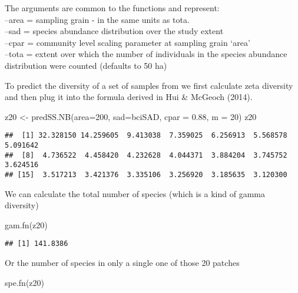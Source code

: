\documentclass[
]{article}
\newenvironment{Shaded}{\begin{snugshade}}{\end{snugshade}}
\newcommand{\AttributeTok}[1]{\textcolor[rgb]{0.77,0.63,0.00}{#1}}
\newcommand{\DecValTok}[1]{\textcolor[rgb]{0.00,0.00,0.81}{#1}}
\newcommand{\FloatTok}[1]{\textcolor[rgb]{0.00,0.00,0.81}{#1}}
\newcommand{\FunctionTok}[1]{\textcolor[rgb]{0.00,0.00,0.00}{#1}}
\newcommand{\NormalTok}[1]{#1}
\newcommand{\OtherTok}[1]{\textcolor[rgb]{0.56,0.35,0.01}{#1}}
\begin{document}
The arguments are common to the functions and represent:\\
--area = sampling grain - in the same units as tota.\\
--sad = species abundance distribution over the study extent\\
--cpar = community level scaling parameter at sampling grain `area'\\
--tota = extent over which the number of individuals in the species
abundance distribution were counted (defaults to 50 ha)

To predict the diversity of a set of samples from we first calculate
zeta diversity and then plug it into the formula derived in Hui \&
McGeoch (2014).

\begin{Shaded}
\begin{Highlighting}[]
\NormalTok{z20 }\OtherTok{\textless{}{-}} \FunctionTok{predSS.NB}\NormalTok{(}\AttributeTok{area=}\DecValTok{200}\NormalTok{, }\AttributeTok{sad=}\NormalTok{bciSAD, }\AttributeTok{cpar =} \FloatTok{0.88}\NormalTok{, }\AttributeTok{m =} \DecValTok{20}\NormalTok{)}
\NormalTok{z20}
\end{Highlighting}
\end{Shaded}

\begin{verbatim}
##  [1] 32.328150 14.259605  9.413038  7.359025  6.256913  5.568578  5.091642
##  [8]  4.736522  4.458420  4.232628  4.044371  3.884204  3.745752  3.624516
## [15]  3.517213  3.421376  3.335106  3.256920  3.185635  3.120300
\end{verbatim}

We can calculate the total number of species (which is a kind of gamma
diversity)

\begin{Shaded}
\begin{Highlighting}[]
\FunctionTok{gam.fn}\NormalTok{(z20)}
\end{Highlighting}
\end{Shaded}

\begin{verbatim}
## [1] 141.8386
\end{verbatim}

Or the number of species in only a single one of those 20 patches

\begin{Shaded}
\begin{Highlighting}[]
\FunctionTok{spe.fn}\NormalTok{(z20)}
\end{Highlighting}
\end{Shaded}
\end{document}
